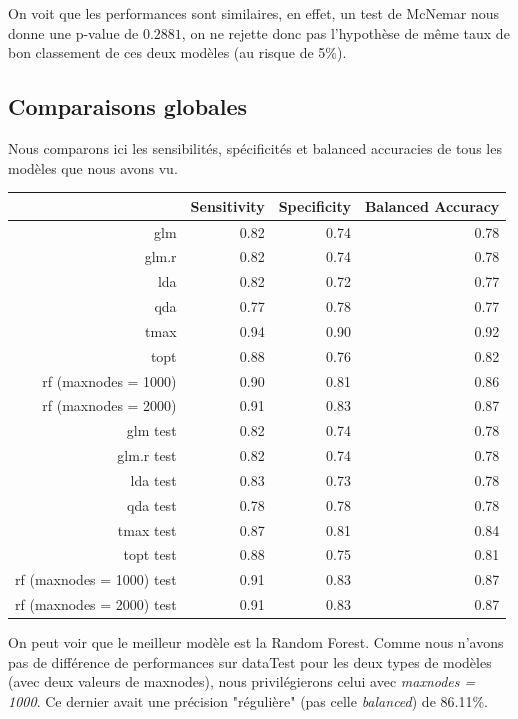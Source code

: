 \documentclass{article}
\begin{document}
On voit que les performances sont similaires, en effet, un test de McNemar nous donne une p-value de $0.2881$, on ne rejette donc pas l'hypothèse de même taux de bon classement de ces deux modèles (au risque de 5\%).

\subsection{Comparaisons globales}

Nous comparons ici les sensibilités, spécificités et balanced accuracies de tous les modèles que nous avons vu. 

\begin{table}[ht]
    \centering
    \begin{tabular}{|r|rrr|}
        \hline
        & Sensitivity & Specificity & Balanced Accuracy \\ 
        \hline
        glm & 0.82 & 0.74 & 0.78 \\ 
        glm.r & 0.82 & 0.74 & 0.78 \\ 
        lda & 0.82 & 0.72 & 0.77 \\ 
        qda & 0.77 & 0.78 & 0.77 \\ 
        tmax & 0.94 & 0.90 & 0.92 \\ 
        topt & 0.88 & 0.76 & 0.82 \\ 
        rf (maxnodes = 1000) & 0.90 & 0.81 & 0.86 \\ 
        rf (maxnodes = 2000) & 0.91 & 0.83 & 0.87 \\ 
        \hline
        \hline
        glm test & 0.82 & 0.74 & 0.78 \\ 
        glm.r test & 0.82 & 0.74 & 0.78 \\ 
        lda test & 0.83 & 0.73 & 0.78 \\ 
        qda test & 0.78 & 0.78 & 0.78 \\ 
        tmax test & 0.87 & 0.81 & 0.84 \\ 
        topt test & 0.88 & 0.75 & 0.81 \\ 
        rf (maxnodes = 1000) test & 0.91 & 0.83 & 0.87 \\ 
        rf (maxnodes = 2000) test & 0.91 & 0.83 & 0.87 \\ 
        \hline
    \end{tabular}
\end{table}

On peut voir que le meilleur modèle est la Random Forest. Comme nous n'avons pas de différence de performances sur dataTest pour les deux types de modèles (avec deux valeurs de maxnodes), nous privilégierons celui avec \emph{maxnodes = 1000}. Ce dernier avait une précision "régulière" (pas celle \emph{balanced}) de 86.11\%.
\end{document}
